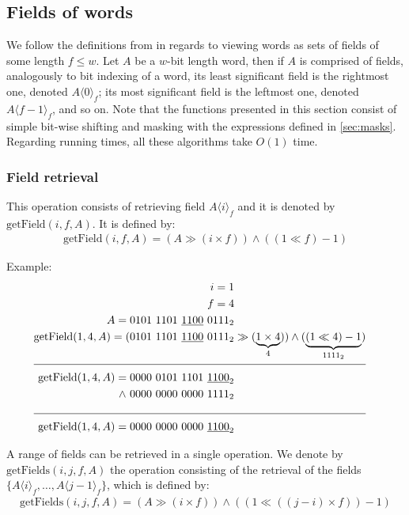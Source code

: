 \subsection{Fields of words} \label{sec:fieldsOfWords}

We follow the definitions from \cite{patrascu2014dynamic} in regards to viewing words as sets of fields of some length $f \leq w$. Let $A$ be a $w$-bit length word, then if $A$ is comprised of fields, analogously to bit indexing of a word, its least significant field is the rightmost one, denoted $A\langle0\rangle_f$; its most significant field is the leftmost one, denoted $A\langle f-1\rangle_f$, and so on.
Note that the functions presented in this section consist of simple bit-wise shifting and masking with the expressions defined in \ref{sec:masks}. Regarding running times, all these algorithms take $O(1)$ time.

\subsubsection{Field retrieval} \label{sec:fieldRetrieval}

This operation consists of retrieving field $A\langle i\rangle_f$ and it is denoted by $\text{getField}(i, f, A)$. It is defined by:
\begin{align*}
    \text{getField}(i, f, A) = (A \gg (i \times f)) \wedge ((1 \ll f) - 1)
\end{align*}

Example:
\begin{align*}
    i = 1\\
    f = 4\\
    A = 0101\ 1101\ \underline{1100}\ 0111_2& \\
    \text{getField}(1, 4, A) = (0101\ 1101\ \underline{1100}\ 0111_2& \gg (\underbrace{1 \times 4}_{4})) \wedge (\underbrace{(1 \ll 4) - 1}_{1111_2})\\
    \cline{1-2}
    \text{getField}(1, 4, A) = 0000\ 0101\ 1101\ \underline{1100}_2& \\
    \wedge\ 0000\ 0000\ 0000\ 1111_2& \\
    \cline{1-2}
    \text{getField}(1, 4, A) = 0000\ 0000\ 0000\ \underline{1100}_2&
\end{align*}

A range of fields can be retrieved in a single operation. We denote by $\text{getFields}(i, j, f, A)$ the operation consisting of the retrieval of the fields $\{A\langle i\rangle_f,\dots , A\langle j-1\rangle_f\}$, which is defined by:
\begin{align*}
    \text{getFields}(i, j, f, A) = (A \gg (i \times f)) \wedge ((1 \ll ((j - i) \times f)) - 1)
\end{align*}

